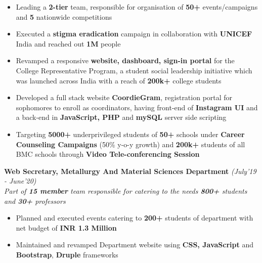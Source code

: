\documentclass[10.5pt]{article}
\begin{document}
\begin{itemize}[itemsep = -.5mm, leftmargin=*]
\vspace{-5pt}
    \item Leading a \textbf{2-tier} team, responsible for organisation of \textbf{50+} events/campaigns and \textbf{5} nationwide competitions
    
    \item Executed a \textbf{stigma eradication} campaign in collaboration with \textbf{UNICEF} India and reached out \textbf{1M} people
    
    
    \item Revamped a responsive \textbf{website, dashboard, sign-in portal} for the College Representative Program, a student social leadership initiative which was launched across India with a reach of \textbf{200k+} college students
    
    
    \item Developed a full stack website \textbf{CoordieGram}, registration portal for sophomores to enroll as coordinators, having front-end of \textbf{Instagram UI} and a back-end in \textbf{JavaScript, PHP} and \textbf{mySQL} server side scripting
    
    \item Targeting \textbf{5000+} underprivileged students of \textbf{50+} schools under \textbf{Career Counseling Campaigns} (50\% y-o-y growth) and \textbf{200k+} students of all BMC schools through \textbf{Video Tele-conferencing Session} 
    
\end{itemize}
	
	\vspace{0pt}
	\hspace{-19 pt}
	\textbf{Web Secretary, Metallurgy And Material Sciences Department}  \hfill{\sl \small (July'19 - June'20)}  \\
	
	\vspace{-10pt}
	\hspace{-19pt}
\textit{Part of \textbf{15 member} team responsible for  catering to the needs \textbf{800+} students and \textbf{30+} professors }\\
\vspace{-19pt}
	\begin{itemize}[itemsep = -.5 mm, leftmargin=*]
        \item Planned and executed events catering to \textbf{200+} students of department with net budget of \textbf{INR 1.3 Million}
        
        \item Maintained and revamped Department website using \textbf{CSS, JavaScript} and \textbf{Bootstrap},  \textbf{Druple} frameworks
        
        
	\end{itemize}
\end{document}
